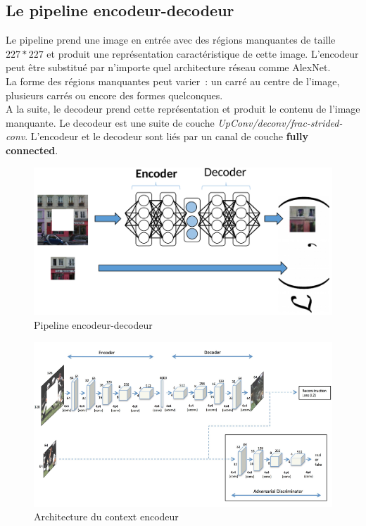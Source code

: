 \documentclass[11pt,a4paper]{article}
\begin{document}
    \subsection{Le pipeline encodeur-decodeur}
        Le pipeline prend une image en entrée avec des régions manquantes de taille $227*227$ et produit une représentation caractéristique de cette image. L’encodeur peut être substitué par n’importe quel architecture réseau comme AlexNet.\\
    La forme des régions manquantes peut varier : un carré au centre de l’image, plusieurs carrés ou encore des formes quelconques.\\
    A la suite, le decodeur prend cette représentation et produit le contenu de l’image manquante. Le decodeur est une suite de couche \emph{UpConv/deconv/frac-strided-conv}. L’encodeur et le decodeur sont liés par un canal de couche \textbf{fully connected}.
        \begin{figure}[H]
            \centering
            \includegraphics[scale=0.2]{pipeline.png} 
            \caption{Pipeline encodeur-decodeur}
        \end{figure}
        
        \begin{figure}[H]
            \centering
            \includegraphics[scale=0.55]{architecture.png} 
            \caption{Architecture du context encodeur}
        \end{figure}
\end{document}
